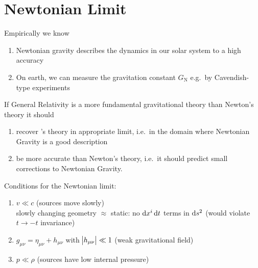 \section{Newtonian Limit}
Empirically we know
\begin{enumerate}
    \item Newtonian gravity describes the dynamics in our solar system to a high accuracy
    \item On earth, we can measure the gravitation constant $G_\text{N}$ e.g.\ by Cavendish-type  experiments
\end{enumerate}
If General Relativity is a more fundamental gravitational theory than Newton's theory it should
\begin{enumerate}
    \item recover 's theory in appropriate limit, i.e.\ in the domain where Newtonian Gravity is a good description
    \item be more accurate than Newton's theory, i.e.\ it should predict small corrections to Newtonian Gravity.
\end{enumerate}
Conditions for the Newtonian limit:
\begin{enumerate}
    \item $v \ll c$ (sources move slowly) \\
    slowly changing geometry $\approx$ static: no $\dif{x}^i\dif t$ terms in
    $\dif{s}^2$ (would violate $t\rightarrow -t$ invariance)
    \item $g_{\mu\nu} = \eta_{\mu\nu} + h_{\mu\nu}$ with $\abs{h_{\mu\nu}} \ll 1$ (weak gravitational field)
    \item $p \ll \rho$ (sources have low internal pressure)
\end{enumerate}
